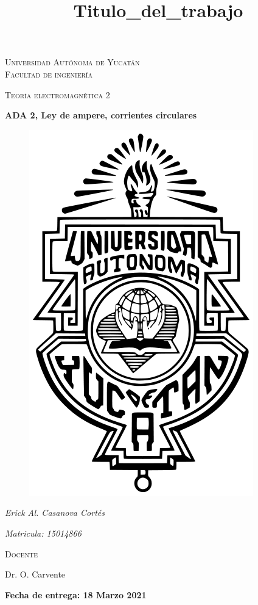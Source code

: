 \documentclass[11pt]{report}
\theoremstyle{plain}
\theoremstyle{definition}
\begin{document}
\begin{titlepage}
\title{Titulo_del_trabajo}


	\centering
	{\scshape\LARGE Universidad Autónoma de Yucatán  \\ Facultad de ingeniería\par}
	\vspace{1cm}
	{\scshape\Large Teoría electromagnética 2\par}
	\vspace{1.5cm}
	{\huge\bfseries ADA 2, Ley de ampere, corrientes circulares\par}
	\vspace{0.7cm}
	{\begin{figure}[!h]
	\centering
    \includegraphics[scale=0.3]{UADY.png}
	\end{figure}}
	\vspace{0.7cm}
	{\Large\itshape Erick Al. Casanova Cortés\par}
	{\Large\itshape Matricula: 15014866\par}
	\vfill
	{\scshape\Large Docente\par
	Dr. O. Carvente\par}
	\vfill
	{\Large{\bfseries Fecha de entrega: 18 Marzo 2021} }

	\vfill
	
\end{titlepage}
\end{document}
